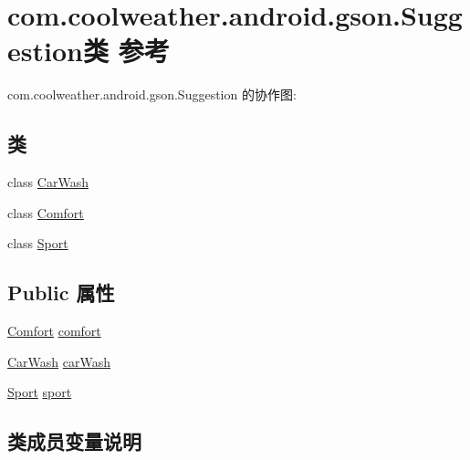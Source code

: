 \hypertarget{classcom_1_1coolweather_1_1android_1_1gson_1_1_suggestion}{}\section{com.\+coolweather.\+android.\+gson.\+Suggestion类 参考}
\label{classcom_1_1coolweather_1_1android_1_1gson_1_1_suggestion}


com.\+coolweather.\+android.\+gson.\+Suggestion 的协作图\+:
\subsection*{类}
\begin{DoxyCompactItemize}
\item 
class \mbox{\hyperlink{classcom_1_1coolweather_1_1android_1_1gson_1_1_suggestion_1_1_car_wash}{Car\+Wash}}
\item 
class \mbox{\hyperlink{classcom_1_1coolweather_1_1android_1_1gson_1_1_suggestion_1_1_comfort}{Comfort}}
\item 
class \mbox{\hyperlink{classcom_1_1coolweather_1_1android_1_1gson_1_1_suggestion_1_1_sport}{Sport}}
\end{DoxyCompactItemize}
\subsection*{Public 属性}
\begin{DoxyCompactItemize}
\item 
\mbox{\hyperlink{classcom_1_1coolweather_1_1android_1_1gson_1_1_suggestion_1_1_comfort}{Comfort}} \mbox{\hyperlink{classcom_1_1coolweather_1_1android_1_1gson_1_1_suggestion_ac58db4ed30223d615220ce71276bec67}{comfort}}
\item 
\mbox{\hyperlink{classcom_1_1coolweather_1_1android_1_1gson_1_1_suggestion_1_1_car_wash}{Car\+Wash}} \mbox{\hyperlink{classcom_1_1coolweather_1_1android_1_1gson_1_1_suggestion_a2fb06cd7a4095c9a5798de5fab3c9a52}{car\+Wash}}
\item 
\mbox{\hyperlink{classcom_1_1coolweather_1_1android_1_1gson_1_1_suggestion_1_1_sport}{Sport}} \mbox{\hyperlink{classcom_1_1coolweather_1_1android_1_1gson_1_1_suggestion_a2f861e694c9e9626ddcf7b48ec31efda}{sport}}
\end{DoxyCompactItemize}


\subsection{类成员变量说明}
\mbox{\label{classcom_1_1coolweather_1_1android_1_1gson_1_1_suggestion_a2fb06cd7a4095c9a5798de5fab3c9a52}} 
